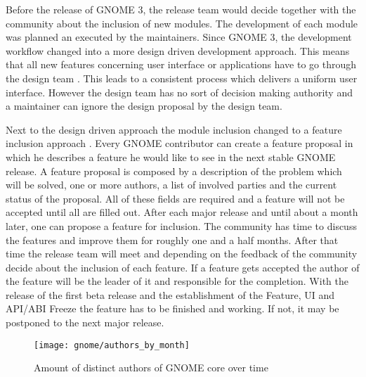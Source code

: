 Before the release of GNOME 3, the release team would decide together with the
community about the inclusion of new modules. The development of each module
was planned an executed by the maintainers. Since GNOME 3, the development
workflow changed into a more design driven development approach. This means
that all new features concerning user interface or applications have to go
through the design team \cite{GNOMEDesignTeam}. This leads to a consistent
process which delivers a uniform user interface. However the design team has no
sort of decision making authority and a maintainer can ignore the design
proposal by the design team.

Next to the design driven approach the module inclusion changed to a feature
inclusion approach \cite{GNOMEFeatures3.4,GNOMERoadMap}. Every GNOME
contributor can create a feature proposal in which he describes a feature he
would like to see in the next stable GNOME release. A feature proposal is
composed by a description of the problem which will be solved, one or more
authors, a list of involved parties and the current status of the proposal. All
of these fields are required and a feature will not be accepted until all are
filled out. After each major release and until about a month later, one can
propose a feature for inclusion. The community has time to discuss the features
and improve them for roughly one and a half months. After that time the release
team will meet and depending on the feedback of the community decide about the
inclusion of each feature. If a feature gets accepted the author of the feature
will be the leader of it and responsible for the completion. With the release
of the first beta release and the establishment of the Feature, UI and
\ac{API}/\ac{ABI} Freeze the feature has to be finished and working. If not, it
may be postponed to the next major release.

\begin{figure}[htbp]
  \centering
  \texttt{[image: gnome/authors\_by\_month]}
  \caption{Amount of distinct authors of GNOME core over time}
\end{figure}


